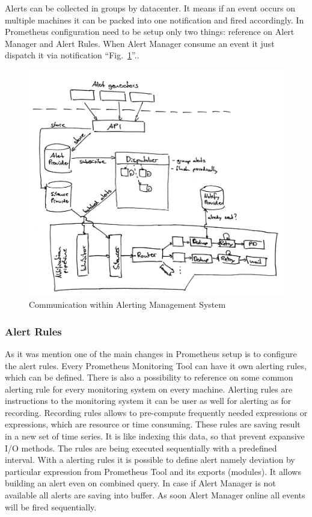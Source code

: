 Alerts can be collected in groups by datacenter. It means if an event occurs on multiple machines it can be packed into one notification and fired accordingly. 
In Prometheus configuration need to be setup only two things: reference on Alert Manager and Alert Rules. When Alert Manager consume an event it just dispatch it via notification ``Fig.~\ref{fig:alert_arch_detailed}''.. 

\begin{figure}[htbp]
\begin{center}
  \includegraphics[width=\linewidth]{components/3/alert_arch_detailed.png}
  \caption{Communication within Alerting Management System}
  \label{fig:alert_arch_detailed}
\end{center}
\end{figure}

\subsubsection{Alert Rules}\label{Alert Rules}

As it was mention one of the main changes in Prometheus setup is to configure the alert rules. Every Prometheus Monitoring Tool can have it own alerting rules, which can be defined. There is also a possibility to reference on some common alerting rule for every monitoring system on every machine. 
Alerting rules are instructions to the monitoring system it can be user as well for alerting as for recording. 
Recording rules allows to pre-compute frequently needed expressions or expressions, which are resource or time consuming.  These rules are saving result in a new set of time series. It is like indexing this data, so that prevent expansive I/O methods. 
The rules are being executed sequentially with a predefined interval. 
With a alerting rules it is possible to define alert namely deviation by particular expression from Prometheus Tool and its exports (modules). It allows building an alert even on combined query. 
In case if Alert Manager is not available all alerts are saving into buffer. As soon Alert Manager online all events will be fired sequentially. 

